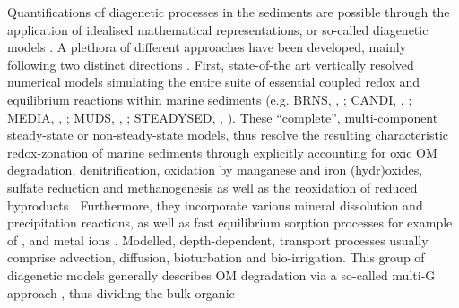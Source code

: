 \documentclass[gmd, manuscript]{copernicus}
\begin{document}
Quantifications of diagenetic processes in the sediments are possible through the application of idealised mathematical representations, or so-called diagenetic models \citep[see e.g.][]{berner_early_1980, boudreau1997diagenetic}.
A plethora of different approaches have been developed, mainly following two distinct directions \citep[see][for an overview]{arndt_quantifying_2013}. 
First, state-of-the art vertically resolved numerical models simulating the entire suite of essential coupled redox and equilibrium reactions within marine sediments %
(e.g. BRNS, \citeauthor{aguilera_knowledge-based_2005}, \citeyear{aguilera_knowledge-based_2005}; 
CANDI, \citeauthor{boudreau_method--lines_1996}, \citeyear{boudreau_method--lines_1996}; MEDIA, \citeauthor{meysman_reactive_2003}, \citeyear{meysman_reactive_2003}; MUDS, \citeauthor{archer_model_2002}, \citeyear{archer_model_2002}; 
STEADYSED, \citeauthor{cappellen_cycling_1996}, \citeyear{cappellen_cycling_1996}). 
These ``complete'', multi-component steady-state or non-steady-state models, thus resolve the resulting characteristic redox-zonation of marine sediments through explicitly accounting for oxic OM degradation, 
denitrification, oxidation by manganese and iron (hydr)oxides, sulfate reduction and methanogenesis as well as the reoxidation of reduced byproducts 
\citep[i.e. , , , , , see e.g.][]{regnier_quantitative_2011}. 
Furthermore, they incorporate various mineral dissolution and precipitation reactions, as well as fast equilibrium sorption processes for example of 
,  and metal ions \citep[i.e. ,  and , compare][]{cappellen_cycling_1996, meysman_reactive_2003}. 
Modelled, depth-dependent, transport processes usually comprise advection, diffusion, bioturbation and bio-irrigation.   
This group of diagenetic models generally describes OM degradation via a so-called multi-G approach \citep{joergensen_comparison_1978_2, berner_early_1980}, thus dividing the bulk organic 
\end{document}
